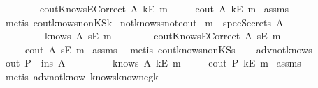 \begin{isabellebody}
\ \ \ \ \ \ \ \ {\isachardoublequoteopen}eoutKnowsECorrect\ A\ {\isacharparenleft}kE\ m{\isacharparenright}{\isachardoublequoteclose}\isanewline
{}\ \ \ \ {\isachardoublequoteopen}{\isasymnot}\ eout\ A\ {\isacharparenleft}kE\ m{\isacharparenright}{\isachardoublequoteclose}\isanewline
%
\isadelimproof
%
\endisadelimproof
%
\isatagproof
{}\isamarkupfalse%
\ assms\ \isamarkupfalse%
\ {\isacharparenleft}metis\ eout{\isacharunderscore}knows{\isacharunderscore}nonKS{\isacharunderscore}k{\isacharparenright}%
\endisatagproof
{\isafoldproof}%
%
\isadelimproof
\isanewline
%
\endisadelimproof
\isanewline
{}\isamarkupfalse%
\ not{\isacharunderscore}knows{\isacharunderscore}s{\isacharunderscore}not{\isacharunderscore}eout{\isacharcolon}\isanewline
{}\ {\isachardoublequoteopen}m\ {\isasymnotin}\ specSecrets\ A{\isachardoublequoteclose}\isanewline
\ \ \ \ \ \ \ \ {\isachardoublequoteopen}{\isasymnot}\ knows\ A\ {\isacharbrackleft}sE\ m{\isacharbrackright}{\isachardoublequoteclose}\isanewline
\ \ \ \ \ \ \ \ {\isachardoublequoteopen}eoutKnowsECorrect\ A\ {\isacharparenleft}sE\ m{\isacharparenright}{\isachardoublequoteclose}\isanewline
{}\ \ \ \ {\isachardoublequoteopen}{\isasymnot}\ eout\ A\ {\isacharparenleft}sE\ m{\isacharparenright}{\isachardoublequoteclose}\isanewline
%
\isadelimproof
%
\endisadelimproof
%
\isatagproof
{}\isamarkupfalse%
\ assms\ \isamarkupfalse%
\ {\isacharparenleft}metis\ eout{\isacharunderscore}knows{\isacharunderscore}nonKS{\isacharunderscore}s{\isacharparenright}%
\endisatagproof
{\isafoldproof}%
%
\isadelimproof
\ \isanewline
%
\endisadelimproof
\isanewline
{}\isamarkupfalse%
\ \ adv{\isacharunderscore}not{\isacharunderscore}knows{}{\isacharcolon}\isanewline
{}\ {\isachardoublequoteopen}out\ P\ {\isasymsubseteq}\ ins\ A{\isachardoublequoteclose}\isanewline
\ \ \ \ \ \ \ \ {\isachardoublequoteopen}{\isasymnot}\ knows\ A\ {\isacharbrackleft}kE\ m{\isacharbrackright}{\isachardoublequoteclose}\isanewline
{}\ \ \ \ {\isachardoublequoteopen}{\isasymnot}\ eout\ P\ {\isacharparenleft}kE\ m{\isacharparenright}{\isachardoublequoteclose}\isanewline
%
\isadelimproof
%
\endisadelimproof
%
\isatagproof
{}\isamarkupfalse%
\ assms\ \isamarkupfalse%
\ {\isacharparenleft}metis\ adv{\isacharunderscore}not{\isacharunderscore}know{}\ knows{}know{\isacharunderscore}neg{\isacharunderscore}k{\isacharparenright}%

\end{isabellebody}
